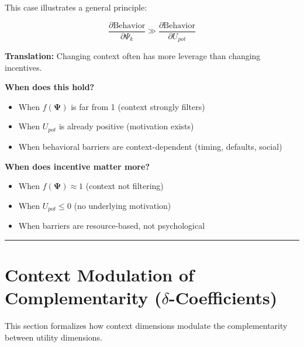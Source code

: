 This case illustrates a general principle:

\begin{equation}
\frac{\partial \text{Behavior}}{\partial \Psi_k} \gg \frac{\partial \text{Behavior}}{\partial U_{pot}}
\label{eq:V-psi-leverage}
\end{equation}

\textbf{Translation:} Changing context often has more leverage than changing incentives.

\textbf{When does this hold?}
\begin{itemize}[nosep]
    \item When $f(\boldsymbol{\Psi})$ is far from 1 (context strongly filters)
    \item When $U_{pot}$ is already positive (motivation exists)
    \item When behavioral barriers are context-dependent (timing, defaults, social)
\end{itemize}

\textbf{When does incentive matter more?}
\begin{itemize}[nosep]
    \item When $f(\boldsymbol{\Psi}) \approx 1$ (context not filtering)
    \item When $U_{pot} \leq 0$ (no underlying motivation)
    \item When barriers are resource-based, not psychological
\end{itemize}

\vspace{1em}
\hrule
\vspace{0.5em}




\section{Context Modulation of Complementarity ($\delta$-Coefficients)}
\label{sec:V-delta}

This section formalizes how context dimensions modulate the complementarity 
between utility dimensions.

